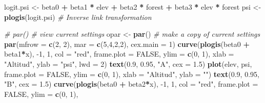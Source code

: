 \documentclass[
]{book}
\newenvironment{Shaded}{\begin{snugshade}}{\end{snugshade}}
\newcommand{\CommentTok}[1]{\textcolor[rgb]{0.56,0.35,0.01}{\textit{#1}}}
\newcommand{\DataTypeTok}[1]{\textcolor[rgb]{0.13,0.29,0.53}{#1}}
\newcommand{\DecValTok}[1]{\textcolor[rgb]{0.00,0.00,0.81}{#1}}
\newcommand{\FloatTok}[1]{\textcolor[rgb]{0.00,0.00,0.81}{#1}}
\newcommand{\KeywordTok}[1]{\textcolor[rgb]{0.13,0.29,0.53}{\textbf{#1}}}
\newcommand{\NormalTok}[1]{#1}
\newcommand{\OperatorTok}[1]{\textcolor[rgb]{0.81,0.36,0.00}{\textbf{#1}}}
\newcommand{\OtherTok}[1]{\textcolor[rgb]{0.56,0.35,0.01}{#1}}
\newcommand{\StringTok}[1]{\textcolor[rgb]{0.31,0.60,0.02}{#1}}
\begin{document}
\begin{Shaded}
\begin{Highlighting}[]
\NormalTok{logit.psi <-}\StringTok{ }\NormalTok{beta0 }\OperatorTok{+}\StringTok{ }\NormalTok{beta1 }\OperatorTok{*}\StringTok{ }\NormalTok{elev }\OperatorTok{+}\StringTok{ }\NormalTok{beta2 }\OperatorTok{*}\StringTok{ }\NormalTok{forest }\OperatorTok{+}\StringTok{ }\NormalTok{beta3 }\OperatorTok{*}\StringTok{ }\NormalTok{elev }\OperatorTok{*}\StringTok{ }\NormalTok{forest}
\NormalTok{psi <-}\StringTok{ }\KeywordTok{plogis}\NormalTok{(logit.psi)      }\CommentTok{# Inverse link transformation}

\CommentTok{# par()              # view current settings}
\NormalTok{opar <-}\StringTok{ }\KeywordTok{par}\NormalTok{()      }\CommentTok{# make a copy of current settings}
\KeywordTok{par}\NormalTok{(}\DataTypeTok{mfrow =} \KeywordTok{c}\NormalTok{(}\DecValTok{2}\NormalTok{, }\DecValTok{2}\NormalTok{), }\DataTypeTok{mar =} \KeywordTok{c}\NormalTok{(}\DecValTok{5}\NormalTok{,}\DecValTok{4}\NormalTok{,}\DecValTok{2}\NormalTok{,}\DecValTok{2}\NormalTok{), }\DataTypeTok{cex.main =} \DecValTok{1}\NormalTok{)}
\KeywordTok{curve}\NormalTok{(}\KeywordTok{plogis}\NormalTok{(beta0 }\OperatorTok{+}\StringTok{ }\NormalTok{beta1}\OperatorTok{*}\NormalTok{x), }\DecValTok{-1}\NormalTok{, }\DecValTok{1}\NormalTok{, }\DataTypeTok{col =} \StringTok{"red"}\NormalTok{, }\DataTypeTok{frame.plot =} \OtherTok{FALSE}\NormalTok{, }\DataTypeTok{ylim =} \KeywordTok{c}\NormalTok{(}\DecValTok{0}\NormalTok{, }\DecValTok{1}\NormalTok{),}
      \DataTypeTok{xlab =} \StringTok{"Altitud"}\NormalTok{, }\DataTypeTok{ylab =} \StringTok{"psi"}\NormalTok{, }\DataTypeTok{lwd =} \DecValTok{2}\NormalTok{)}
\KeywordTok{text}\NormalTok{(}\FloatTok{0.9}\NormalTok{, }\FloatTok{0.95}\NormalTok{, }\StringTok{"A"}\NormalTok{, }\DataTypeTok{cex =} \FloatTok{1.5}\NormalTok{)}
\KeywordTok{plot}\NormalTok{(elev, psi, }\DataTypeTok{frame.plot =} \OtherTok{FALSE}\NormalTok{, }\DataTypeTok{ylim =} \KeywordTok{c}\NormalTok{(}\DecValTok{0}\NormalTok{, }\DecValTok{1}\NormalTok{), }\DataTypeTok{xlab =} \StringTok{"Altitud"}\NormalTok{, }\DataTypeTok{ylab =} \StringTok{""}\NormalTok{)}
\KeywordTok{text}\NormalTok{(}\FloatTok{0.9}\NormalTok{, }\FloatTok{0.95}\NormalTok{, }\StringTok{"B"}\NormalTok{, }\DataTypeTok{cex =} \FloatTok{1.5}\NormalTok{)}
\KeywordTok{curve}\NormalTok{(}\KeywordTok{plogis}\NormalTok{(beta0 }\OperatorTok{+}\StringTok{ }\NormalTok{beta2}\OperatorTok{*}\NormalTok{x), }\DecValTok{-1}\NormalTok{, }\DecValTok{1}\NormalTok{, }\DataTypeTok{col =} \StringTok{"red"}\NormalTok{, }\DataTypeTok{frame.plot =} \OtherTok{FALSE}\NormalTok{, }\DataTypeTok{ylim =} \KeywordTok{c}\NormalTok{(}\DecValTok{0}\NormalTok{, }\DecValTok{1}\NormalTok{), }

\end{Highlighting}
\end{Shaded}
\end{document}
